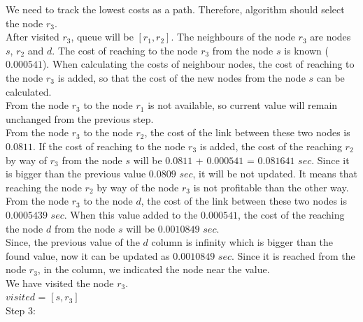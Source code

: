 \documentclass[conference]{IEEEtran}
\begin{document}
We need to track the lowest costs as a path. Therefore, algorithm should select the node $r_3$. \\
After visited $r_3$, queue will be $[r_1,r_2]$. The neighbours of the node $r_3$ are nodes $s$, $r_2$ and $d$. The cost of reaching to the node $r_3$ from the node $s$ is known ($0.000541$). When calculating the costs of neighbour nodes, the cost of reaching to the node $r_3$ is added, so that the cost of the new nodes from the node $s$ can be calculated. \\
From the node $r_3$ to the node $r_1$ is not available, so current value will remain unchanged from the previous step. \\
From the node $r_3$ to the node $r_2$, the cost of the link between these two nodes is $0.0811$. If the cost of reaching to the node $r_3$ is added, the cost of the reaching $r_2$ by way of $r_3$ from the node $s$ will be $0.0811$ + $0.000541$ = $0.081641$ $sec$. Since it is bigger than the previous value $0.0809$ $sec$, it will be not updated. It means that reaching the node $r_2$ by way of the node $r_3$ is not profitable than the other way. \\
From the node $r_3$ to the node $d$, the cost of the link between these two nodes is $0.0005439$ $sec$. When this value added to the $0.000541$, the cost of the reaching the node $d$ from the node $s$ will be $0.0010849$ $sec$.  \\
Since, the previous value of the $d$ column is infinity which is bigger than the found value, now it can be updated as $0.0010849$ $sec$. Since it is reached from the node $r_3$, in the column, we indicated the node near the value. \\
We have visited the node $r_3$. \\
$visited$ = $[s,r_3]$ \\



Step 3: \\
\end{document}
